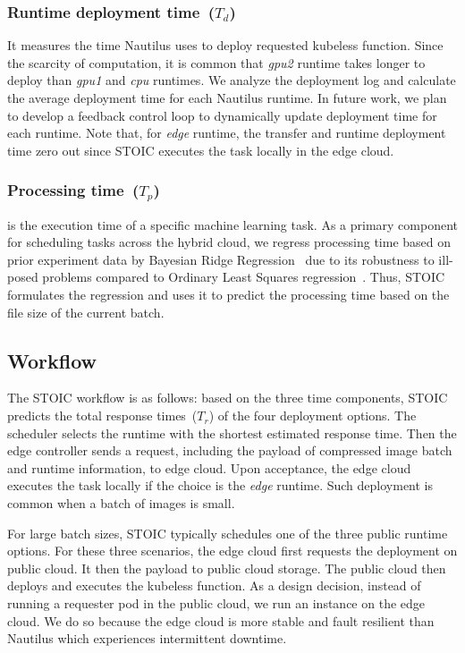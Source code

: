  \subsubsection{Runtime deployment time~($T_d$)} It measures the time Nautilus uses to deploy requested kubeless function. Since the scarcity of computation, it is common that \textit{gpu2} runtime takes longer to deploy than \textit{gpu1} and \textit{cpu} runtimes. We analyze the deployment log and calculate the average deployment time for each Nautilus runtime. In future work, we plan to develop a feedback control loop to dynamically update deployment time for each runtime. Note that, for \textit{edge} runtime, the transfer and runtime deployment time zero out since STOIC executes the task locally in the edge cloud.
 
 \subsubsection{Processing time~($T_p$)} is the execution time of a specific machine learning task. As a primary component for scheduling tasks across the hybrid cloud, we regress processing time based on prior experiment data by Bayesian Ridge Regression~\cite{ref:brr} due to its robustness to ill-posed problems compared to Ordinary Least Squares regression~\cite{ref:ols}. Thus, STOIC formulates the regression and uses it to predict the processing time based on the file size of the current batch. %
 
 \subsection{Workflow}
 The STOIC workflow is as follows: based on the three time components, STOIC predicts the total response times~($T_r$) of the four deployment options. The scheduler selects the runtime with the shortest estimated response time. 
Then the edge controller sends a request, including the payload of compressed image batch and runtime information, to edge cloud. Upon acceptance, the edge cloud executes the task locally if the choice is the \textit{edge} runtime. Such
deployment is common when a batch of images is small. 

For large batch sizes, STOIC typically
schedules one of the three
public runtime options.
For these three scenarios, the edge cloud first requests the deployment 
on public cloud.  It then the payload to public cloud storage.
The public cloud then deploys and executes the kubeless function. 
As a design decision, instead of running a requester pod in the public
cloud, we run an instance on the edge cloud.  We do so because the edge
cloud is more stable and fault resilient than Nautilus which
experiences intermittent downtime.  
 

